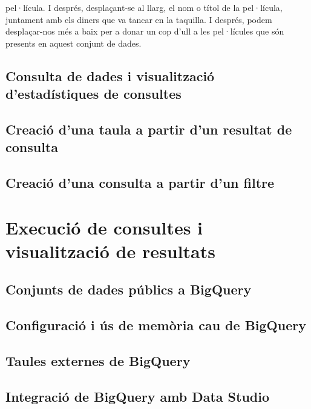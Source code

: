 \documentclass[12pt,longbibliography]{article}
\theoremstyle{definition}
\theoremstyle{remark}
\begin{document}
pel·lícula. I després, desplaçant-se al llarg, el nom o títol de la pel·lícula, juntament amb els diners que va tancar en la taquilla. I després, podem desplaçar-nos més a baix per a donar un cop d'ull a les pel·lícules que són presents en aquest conjunt de dades.

\subsection{Consulta de dades i visualització d'estadístiques de consultes}

\subsection{Creació d'una taula a partir d'un resultat de consulta}

\subsection{Creació d'una consulta a partir d'un filtre}

\newpage

\section{Execució de consultes i visualització de resultats}

\subsection{Conjunts de dades públics a BigQuery}

\subsection{Configuració i ús de memòria cau de BigQuery}

\subsection{Taules externes de BigQuery}

\subsection{Integració de BigQuery amb Data Studio}

\newpage
\end{document}

